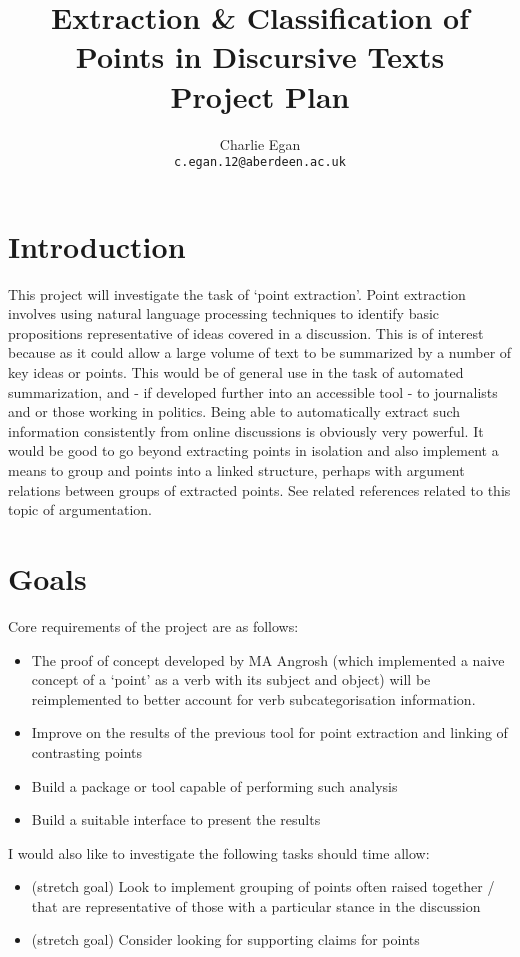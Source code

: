 \documentclass[tikz]{article}
\begin{document}
  \title{Extraction \& Classification of Points in Discursive Texts\\ Project Plan}
  \author{Charlie Egan \\ \texttt{c.egan.12@aberdeen.ac.uk}}

  \maketitle

  \section{Introduction}
  This project will investigate the task of `point extraction'. Point extraction involves using natural language processing techniques to identify basic propositions representative of ideas covered in a discussion. This is of interest because as it could allow a large volume of text to be summarized by a number of key ideas or points. This would be of general use in the task of automated summarization, and - if developed further into an accessible tool - to journalists and or those working in politics. Being able to automatically extract such information consistently from online discussions is obviously very powerful. It would be good to go beyond extracting points in isolation and also implement a means to group and points into a linked structure, perhaps with argument relations between groups of extracted points. See related references \cite{catsdogs, contradictions, opinion, wyner} related to this topic of argumentation.

  \section{Goals}
    Core requirements of the project are as follows:
    \begin{itemize}
      \item{The proof of concept \citep{existing} developed by MA Angrosh (which implemented a naive concept of a `point' as a verb with its subject and object) will be reimplemented to better account for verb subcategorisation information.}
      \item{Improve on the results of the previous tool for point extraction and linking of contrasting points}
      \item{Build a package or tool capable of performing such analysis}
      \item{Build a suitable interface to present the results}
    \end{itemize}
    I would also like to investigate the following tasks should time allow:
    \begin{itemize}
      \item{(stretch goal) Look to implement grouping of points often raised together / that are representative of those with a particular stance in the discussion}
      \item{(stretch goal) Consider looking for supporting claims for points}
    \end{itemize}
\end{document}
